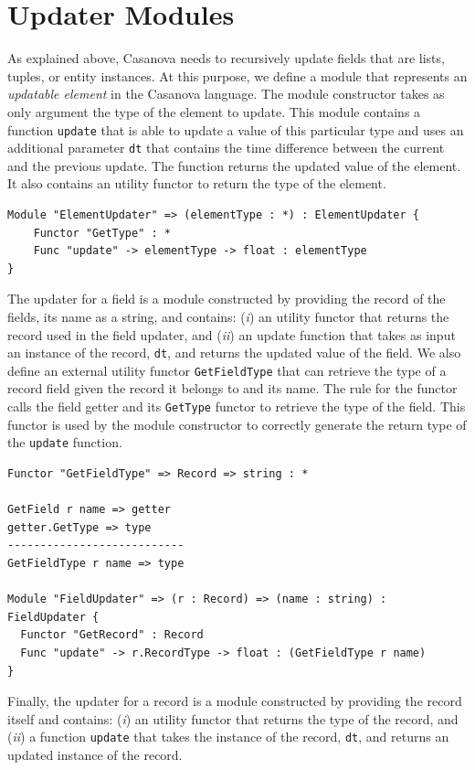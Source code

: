 \section{Updater Modules}
\label{subsec:ch_networking_updater_modules}
As explained above, Casanova needs to recursively update fields that are lists, tuples, or entity instances. At this purpose, we define a module that represents an \textit{updatable element} in the Casanova language. The module constructor takes as only argument the type of the element to update. This module contains a function \texttt{update} that is able to update a value of this particular type and uses an additional parameter \texttt{dt} that contains the time difference between the current and the previous update. The function returns the updated value of the element. It also contains an utility functor to return the type of the element.
 
\begin{lstlisting}
Module "ElementUpdater" => (elementType : *) : ElementUpdater {
	Functor "GetType" : *
	Func "update" -> elementType -> float : elementType
}
\end{lstlisting}

\noindent
The updater for a field is a module constructed by providing the record of the fields, its name as a string, and contains: (\textit{i}) an utility functor that returns the record used in the field updater, and (\textit{ii}) an update function that takes as input an instance of the record, \texttt{dt}, and returns the updated value of the field. We also define an external utility functor \texttt{GetFieldType} that can retrieve the type of a record field given the record it belongs to and its name. The rule for the functor calls the field getter and its \texttt{GetType} functor to retrieve the type of the field. This functor is used by the module constructor to correctly generate the return type of the \texttt{update} function.

\begin{lstlisting}
Functor "GetFieldType" => Record => string : *

GetField r name => getter
getter.GetType => type
---------------------------
GetFieldType r name => type

Module "FieldUpdater" => (r : Record) => (name : string) : FieldUpdater {
  Functor "GetRecord" : Record
  Func "update" -> r.RecordType -> float : (GetFieldType r name)
}
\end{lstlisting}

\noindent
Finally, the updater for a record is a module constructed by providing the record itself and contains: (\textit{i}) an utility functor that returns the type of the record, and (\textit{ii}) a function \texttt{update} that takes the instance of the record, \texttt{dt}, and returns an updated instance of the record.

